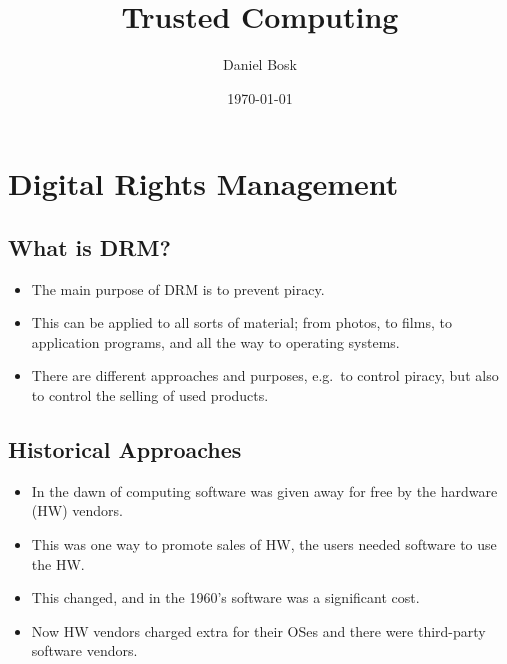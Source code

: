 \documentclass{beamer}
\title{%
  Trusted Computing
}
\author[D.~Bosk]{%
  Daniel Bosk
}
\institute[MIUN ICS]{%
  Department of Information and Communication Systems,\\
  Mid Sweden University, Sundsvall.
}
\date{\today}
\begin{document}
\begin{frame}
  \titlepage{}
\end{frame}





\section{Digital Rights Management}

\subsection{What is DRM?}

\begin{frame}
  \begin{itemize}
    \item The main purpose of DRM is to prevent piracy.

    \item This can be applied to all sorts of material; from photos, to films, 
      to application programs, and all the way to operating systems.

    \item There are different approaches and purposes, e.g.\ to control piracy, 
      but also to control the selling of used products.

  \end{itemize}
\end{frame}

\subsection{Historical Approaches}

\begin{frame}
  \begin{itemize}
    \item In the dawn of computing software was given away for free by the 
      hardware (HW) vendors.

    \item This was one way to promote sales of HW, the users needed software to 
      use the HW\@.

    \item This changed, and in the 1960's software was a significant cost.

    \item Now HW vendors charged extra for their OSes and there were 
      third-party software vendors.
  \end{itemize}
\end{frame}
\end{document}
